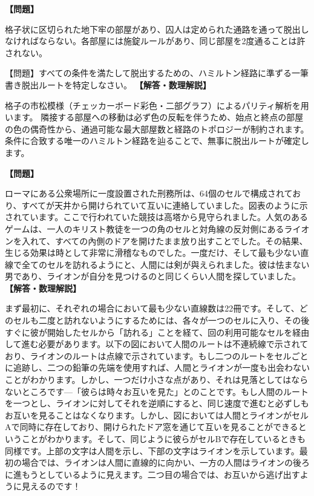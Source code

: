 \documentclass[10pt,a4paper,oneside,openany]{ltjsbook}
\begin{document}
\begin{tcolorbox}[colback=softblue,colframe=primaryblue,title=\textbf{第 323 問：地下牢からの脱出経路 （原題: A DUNGEON PUZZLE.）},arc=2mm,boxrule=1pt,breakable]
\textbf{【問題】}\par\vspace{0.3em}
格子状に区切られた地下牢の部屋があり、囚人は定められた通路を通って脱出しなければならない。各部屋には施錠ルールがあり、同じ部屋を2度通ることは許されない。

【問題】すべての条件を満たして脱出するための、ハミルトン経路に準ずる一筆書き脱出ルートを特定しなさい。
\tcblower
\textbf{【解答・数理解説】}\par\vspace{0.3em}
格子の市松模様（チェッカーボード彩色・二部グラフ）によるパリティ解析を用います。
隣接する部屋への移動は必ず色の反転を伴うため、始点と終点の部屋の色の偶奇性から、通過可能な最大部屋数と経路のトポロジーが制約されます。条件に合致する唯一のハミルトン経路を辿ることで、無事に脱出ルートが確定します。
\end{tcolorbox}

\begin{tcolorbox}[colback=softblue,colframe=primaryblue,title=\textbf{第 324 問：ライオンと人間 （原題: THE LION AND THE MAN.）},arc=2mm,boxrule=1pt,breakable]
\textbf{【問題】}\par\vspace{0.3em}
ローマにある公衆場所に一度設置された刑務所は、64個のセルで構成されており、すべてが天井から開けられていて互いに連絡していました。図表のように示されています。ここで行われていた競技は高塔から見守られました。人気のあるゲームは、一人のキリスト教徒を一つの角のセルと対角線の反対側にあるライオンを入れて、すべての內側のドアを開けたまま放り出すことでした。その結果、生じる効果は時として非常に滑稽なものでした。一度だけ、そして最も少ない直線で全てのセルを訪れるようにと、人間には剣が與えられました。彼は怯まない男であり、ライオンが自分を見つけるのと同じくらい人間を探していました。
\tcblower
\textbf{【解答・数理解説】}\par\vspace{0.3em}
まず最初に、それぞれの場合において最も少ない直線数は22冊です。そして、どのセルも二度と訪れないようにするためには、各々が一つのセルに入り、その後すぐに彼が開始したセルから「訪れる」ことを経て、回の利用可能なセルを経由して進む必要があります。以下の図において人間のルートは不連続線で示されており、ライオンのルートは点線で示されています。もし二つのルートをセルごとに追跡し、二つの鉛筆の先端を使用すれば、人間とライオンが一度も出会わないことがわかります。しかし、一つだけ小さな点があり、それは見落としてはならないところです—「彼らは時々お互いを見た」とのことです。もし人間のルートを一つとし、ライオンに対してそれを逆順にすると、同じ速度で進むと必ずしもお互いを見ることはなくなります。しかし、図においては人間とライオンがセルAで同時に存在しており、開けられたドア窓を通じて互いを見ることができるということがわかります。そして、同じように彼らがセルBで存在しているときも同様です。上部の文字は人間を示し、下部の文字はライオンを示しています。最初の場合では、ライオンは人間に直線的に向かい、一方の人間はライオンの後ろに進もうとしているように見えます。二つ目の場合では、お互いから逃げ出すように見えるのです！
\end{tcolorbox}
\end{document}
